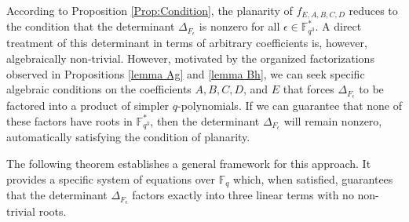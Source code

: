 \documentclass[12pt]{amsart}
\begin{document}
	According to Proposition \ref{Prop:Condition}, the planarity of $f_{E,A,B,C,D}$ reduces to the condition that the determinant $\Delta_{F_{\epsilon}}$ is nonzero for all $\epsilon \in \mathbb{F}_{q^3}^*$. A direct treatment of this determinant in terms of arbitrary coefficients is, however, algebraically non-trivial. However, motivated by the organized factorizations observed in  Propositions \ref{lemma Ag} and \ref{lemma Bh}, we can seek specific algebraic conditions on the coefficients $A, B, C, D$, and $E$ that forces $\Delta_{F_{\epsilon}}$ to be factored into a product of simpler $q$-polynomials. If we can guarantee that none of these factors have roots in $\mathbb{F}_{q^3}^*$, then the determinant $\Delta_{F_{\epsilon}}$ will remain nonzero, automatically satisfying the condition of planarity. 
	
	The following theorem establishes a general framework for this approach. It provides a specific system of equations over $\mathbb{F}_q$ which, when satisfied, guarantees that the determinant $\Delta_{F_{\epsilon}}$ factors exactly into three linear terms with no non-trivial roots.
	
\end{document}
